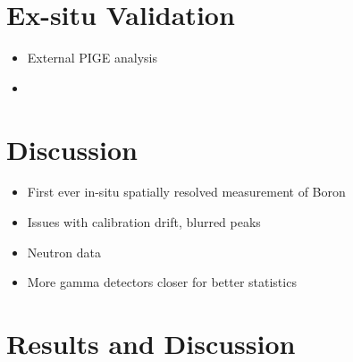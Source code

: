 \documentclass[final,3p,times,twocolumn]{elsarticle}
\begin{document}
\section{Ex-situ Validation}
\begin{itemize}
	\item External PIGE analysis
	\item 
\end{itemize}
\section{Discussion}
\begin{itemize}
	\item First ever in-situ spatially resolved measurement of Boron
	\item Issues with calibration drift, blurred peaks
	\item Neutron data
	\item More gamma detectors closer for better statistics
\end{itemize}

\section{Results and Discussion}





\end{document}
